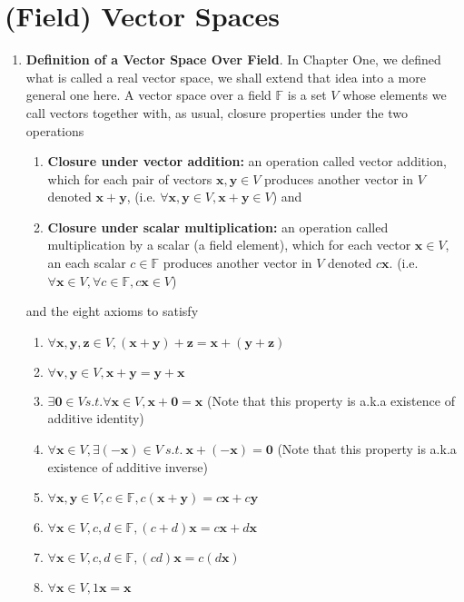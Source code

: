 \documentclass[oneside, 12pt]{book}
\newcommand{\settag}[1]{\renewcommand{\theenumi}{#1}}
\newcommand{\field}{\mathbb{F}}
\newcommand{\tbf}[1]{\textbf{#1}}
\newcommand{\para}[1]{\item \tbf{#1}}
\newcommand{\vzero}{\mathbf{0}}
\begin{document}
\section{(Field) Vector Spaces}
\begin{enumerate}
    \settag{5.2.1}
    \para{Definition of a Vector Space Over Field}. In Chapter One, we defined what is called a 
    real vector space, we shall extend that idea into a more general one here.
    A vector space over a field $\field$ is a set $V$ whose elements we call vectors together with, 
    as usual, closure properties under the two operations 
    \begin{enumerate}
        \item \textbf{Closure under vector addition:} an operation called vector addition, which for each pair of vectors $\mathbf{x}, \mathbf{y}\in V$ produces another 
        vector in $V$ denoted $\mathbf{x} + \mathbf{y}$, (i.e. $\forall \mathbf{x}, \mathbf{y}\in V, \mathbf{x} + \mathbf{y} \in V$) and
        \item \textbf{Closure under scalar multiplication:} an operation called multiplication by a scalar (a field element), which for each vector $\mathbf{x}\in V$, 
        an each scalar $c\in \mathbb{F}$ produces another vector in $V$ denoted $c\mathbf{x}$. (i.e. $\forall \mathbf{x}\in V, \forall c \in \mathbb{F}, c \mathbf{x} \in V$)
    \end{enumerate}
    and the eight axioms to satisfy
    \begin{enumerate}
        \item $\forall \mathbf{x}, \mathbf{y}, \mathbf{z} \in V, (\mathbf{x} + \mathbf{y}) + \mathbf{z} = \mathbf{x} + (\mathbf{y} + \mathbf{z})$
        \item $\forall \mathbf{v}, \mathbf{y} \in V, \mathbf{x} + \mathbf{y} = \mathbf{y} + \mathbf{x}$
        \item $\exists \vzero \in V s.t. \forall \mathbf{x} \in V, \mathbf{x} + \vzero = \mathbf{x}$ (Note that this property is a.k.a existence of additive identity)
        \item $\forall \mathbf{x} \in V, \exists (-\mathbf{x}) \in V~s.t.~\mathbf{x} + (-\mathbf{x}) = \vzero$ (Note that this property is a.k.a existence of additive inverse)
        \item $\forall \mathbf{x}, \mathbf{y} \in V, c \in \mathbb{F}, c(\mathbf{x} + \mathbf{y}) = c\mathbf{x} + c\mathbf{y}$
        \item $\forall \mathbf{x} \in V, c,d \in \mathbb{F}, (c + d)\mathbf{x} = c\mathbf{x} + d\mathbf{x}$
        \item $\forall \mathbf{x} \in V, c,d \in \mathbb{F}, (cd)\mathbf{x} = c(d\mathbf{x})$
        \item $\forall \mathbf{x} \in V, 1\mathbf{x} = \mathbf{x}$
    \end{enumerate}
\end{enumerate}
\end{document}
